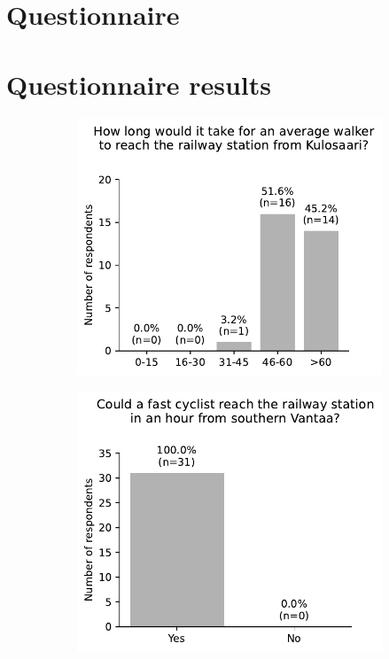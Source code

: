 \begin{appendices}
\makeatletter
\renewcommand{\thesection}{\@arabic\c@section}  %
\makeatother

\section{Questionnaire}



\section{Questionnaire results}

\begin{figure}[H]
	\centering
	\begin{subfigure}[b]{0.5\textwidth}
		\centering
		\includegraphics[width=\textwidth]{visual/figures/survey/0.pdf}
	\end{subfigure}%
	\hfill
	\begin{subfigure}[b]{0.5\textwidth}
		\centering
		\includegraphics[width=\textwidth]{visual/figures/survey/1.pdf}

\end{subfigure}
\end{figure}
\end{appendices}
